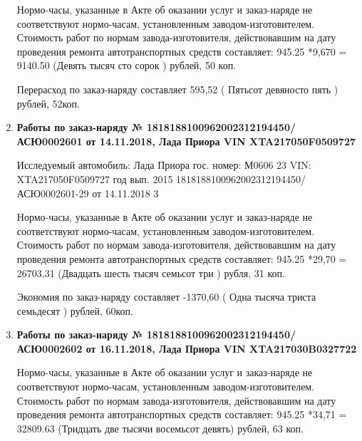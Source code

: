 \begin{enumerate}

Нормо-часы, указанные в Акте об оказании услуг и заказ-наряде не соответствуют нормо-часам,  установленным заводом-изготовителем.\\
Стоимость работ по нормам завода-изготовителя, действовавшим на дату проведения ремонта автотранспортных средств составляет: 945.25 *9,670  = 9140.50  (Девять тысяч сто сорок ) рублей, 50 коп.

Перерасход по заказ-наряду составляет 595,52 ( Пятьсот девяносто пять ) рублей, 52коп.  
\vspace{3mm}





\item \par\textbf{{Работы по заказ-наряду    № 1818188100962002312194450/\-АСЮ0002601 от 14.11.2018, Лада Приора   VIN   XTA217050F0509727
}}


Исследуемый автомобиль:  Лада Приора гос. номер: М0606 23 VIN: XTA217050F0509727 год вып. 2015	1818188100962002312194450/АСЮ0002601-29 от 14.11.2018	3



Нормо-часы, указанные в Акте об оказании услуг и заказ-наряде не соответствуют нормо-часам,  установленным заводом-изготовителем.\\
Стоимость работ по нормам завода-изготовителя, действовавшим на дату проведения ремонта автотранспортных средств составляет: 945.25 *29,70  = 26703,31 (Двадцать шесть тысяч семьсот три ) рубля, 31 коп.

Экономия по заказ-наряду составляет -1370,60 ( Одна тысяча триста семьдесят ) рублей, 60коп.  
\vspace{3mm}



\item \par\textbf{{Работы по заказ-наряду    № 1818188100962002312194450/АСЮ0002602 от 16.11.2018, Лада Приора   VIN XTA217030B0327722
}}



Нормо-часы, указанные в Акте об оказании услуг и заказ-наряде не соответствуют нормо-часам,  установленным заводом-изготовителем.\\
Стоимость работ по нормам завода-изготовителя, действовавшим на дату проведения ремонта автотранспортных средств составляет: 945.25 *34,71  = 32809.63 (Тридцать две тысячи восемьсот девять) рублей, 63 коп.


\end{enumerate}

